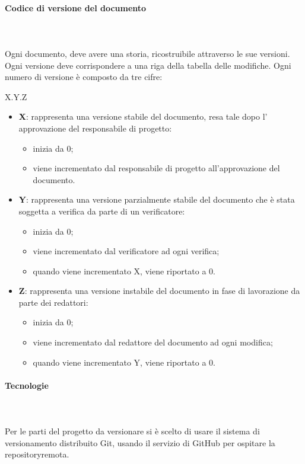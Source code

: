 	\paragraph{Codice di versione del documento} \mbox{}\\ \mbox{}\\
	Ogni documento, deve avere una storia, ricostruibile attraverso le sue versioni. Ogni versione deve corrispondere a una riga della tabella delle modifiche. Ogni numero di versione è composto da tre cifre:
	\begin{center}
		X.Y.Z
	\end{center}
	\begin{itemize}
		\item \textbf{X}: rappresenta una versione stabile del documento, resa tale dopo l' approvazione del responsabile di progetto:
		\begin{itemize}
			\item inizia da 0;
			\item viene incrementato dal responsabile di progetto all'approvazione del documento.
		\end{itemize}
		\item \textbf{Y}: rappresenta una versione parzialmente stabile del documento che è stata soggetta a verifica da parte di un verificatore:
		\begin{itemize}
			\item inizia da 0;
			\item viene incrementato dal verificatore ad ogni verifica;
			\item quando viene incrementato X, viene riportato a 0.
		\end{itemize}
		\item \textbf{Z}: rappresenta una versione instabile del documento in fase di lavorazione da parte dei redattori:
		\begin{itemize}
			\item inizia da 0;
			\item viene incrementato dal redattore del documento ad ogni modifica;
			\item quando viene incrementato Y, viene riportato a 0.
		\end{itemize}			
	\end{itemize}
	\paragraph{Tecnologie} \mbox{}\\ \mbox{}\\
	Per le parti del progetto da versionare si è scelto di usare il sistema di versionamento distribuito Git, usando il servizio di GitHub per ospitare la repository\glosp remota.
